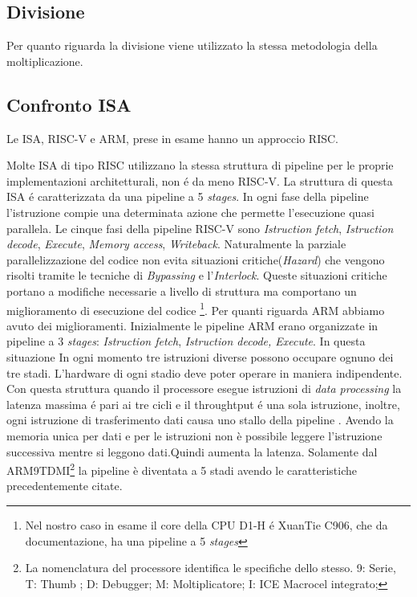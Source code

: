 \documentclass[12pt, a4paper]{report}
\begin{document}
\vspace{2cm}

\subsection{Divisione}
Per quanto riguarda la divisione viene utilizzato la stessa metodologia della moltiplicazione.

\subsection{Confronto ISA}
Le ISA, RISC-V e ARM, prese in esame hanno un approccio RISC. 

Molte ISA di tipo RISC utilizzano la stessa struttura di pipeline per le proprie implementazioni architetturali, non \'e da meno RISC-V. La struttura di questa ISA \'e caratterizzata da una pipeline a 5 \textit{stages}. In ogni fase della pipeline l'istruzione compie una determinata azione che permette l'esecuzione quasi parallela. %
Le cinque fasi della pipeline RISC-V sono \textit{Istruction fetch}, \textit{Istruction decode}, \textit{Execute}, \textit{Memory access}, \textit{Writeback}. %
Naturalmente la parziale parallelizzazione del codice non evita situazioni critiche(\textit{Hazard}) che vengono risolti tramite le tecniche di \textit{Bypassing} e l'\textit{Interlock}. Queste situazioni critiche portano a modifiche necessarie a livello di struttura ma comportano un miglioramento di esecuzione del codice \footnote{Nel nostro caso in esame il core della CPU D1-H \'e XuanTie C906, che da documentazione\cite{DocH1}, ha una pipeline a 5 \textit{stages}}. 
Per quanti riguarda ARM abbiamo avuto dei miglioramenti.  Inizialmente le pipeline ARM erano organizzate in pipeline a 3 \textit{stages}: \textit{Istruction fetch}, \textit{Istruction decode, Execute}. In questa situazione In ogni momento tre istruzioni diverse possono occupare ognuno dei tre stadi. L’hardware di ogni stadio deve poter operare in maniera indipendente. Con questa struttura quando il processore esegue istruzioni di \textit{data processing} la latenza massima \'e pari ai tre cicli e il throughtput \'e una sola istruzione, inoltre, ogni istruzione di trasferimento dati causa uno stallo della pipeline \cite{3stagesPipeline}. Avendo la memoria unica per dati e per le istruzioni non è possibile leggere l’istruzione successiva mentre si leggono dati.Quindi aumenta la latenza. Solamente dal ARM9TDMI\footnote{La nomenclatura del processore identifica le specifiche dello stesso. 9: Serie, T: Thumb ; D: Debugger; M: Moltiplicatore; I: ICE Macrocel integrato;} la pipeline è diventata a 5 stadi avendo le caratteristiche precedentemente citate.
\end{document}
